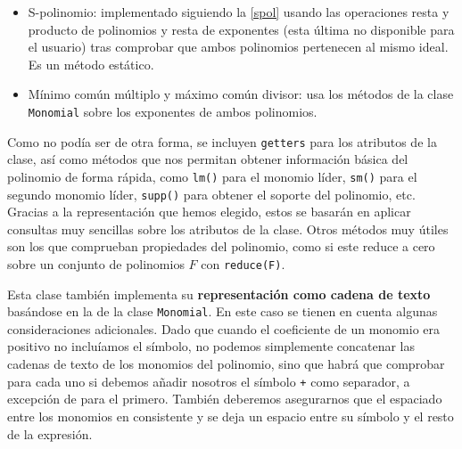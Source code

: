\begin{itemize}
    \item S-polinomio: implementado siguiendo la \autoref{spol} usando las operaciones resta y producto de polinomios y resta de exponentes (esta última no disponible para el usuario) tras comprobar que ambos polinomios pertenecen al mismo ideal. Es un método estático.
    \item Mínimo común múltiplo y máximo común divisor: usa los métodos de la clase \texttt{Monomial} sobre los exponentes de ambos polinomios.
\end{itemize}

Como no podía ser de otra forma, se incluyen \texttt{getters} para los atributos de la clase, así como métodos que nos permitan obtener información básica del polinomio de forma rápida, como \texttt{lm()} para el monomio líder, \texttt{sm()} para el segundo monomio líder, \texttt{supp()} para obtener el soporte del polinomio, etc. Gracias a la representación que hemos elegido, estos se basarán en aplicar consultas muy sencillas sobre los atributos de la clase. Otros métodos muy útiles son los que comprueban propiedades del polinomio, como si este reduce a cero sobre un conjunto de polinomios $F$ con \texttt{reduce(F)}.\newline

Esta clase también implementa su \textbf{representación como cadena de texto} basándose en la de la clase \texttt{Monomial}. En este caso se tienen en cuenta algunas consideraciones adicionales. Dado que cuando el coeficiente de un monomio era positivo no incluíamos el símbolo, no podemos simplemente concatenar las cadenas de texto de los monomios del polinomio, sino que habrá que comprobar para cada uno si debemos añadir nosotros el símbolo \texttt{+} como separador, a excepción de para el primero. También deberemos asegurarnos que el espaciado entre los monomios en consistente y se deja un espacio entre su símbolo y el resto de la expresión.\newline

